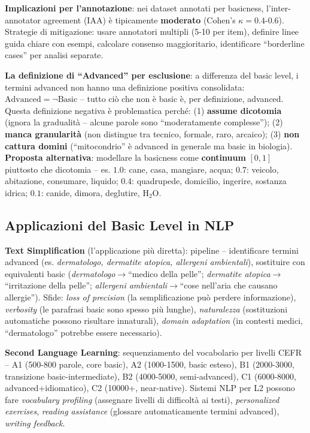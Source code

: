 \documentclass[12pt,a4paper]{article}
\begin{document}
\textbf{Implicazioni per l'annotazione}: nei dataset annotati per basicness, l'inter-annotator agreement (IAA) \`e tipicamente \textbf{moderato} (Cohen's $\kappa = 0.4$-$0.6$). Strategie di mitigazione: usare annotatori multipli (5-10 per item), definire linee guida chiare con esempi, calcolare consenso maggioritario, identificare ``borderline cases'' per analisi separate.

\textbf{La definizione di ``Advanced'' per esclusione}: a differenza del basic level, i termini advanced non hanno una definizione positiva consolidata: $\text{Advanced} = \neg \text{Basic}$ -- tutto ci\`o che non \`e basic \`e, per definizione, advanced. Questa definizione negativa \`e problematica perch\'e: (1) \textbf{assume dicotomia} (ignora la gradualit\`a -- alcune parole sono ``moderatamente complesse''); (2) \textbf{manca granularit\`a} (non distingue tra tecnico, formale, raro, arcaico); (3) \textbf{non cattura domini} (``mitocondrio'' \`e advanced in generale ma basic in biologia). \textbf{Proposta alternativa}: modellare la basicness come \textbf{continuum} $[0,1]$ piuttosto che dicotomia -- es. $1.0$: cane, casa, mangiare, acqua; $0.7$: veicolo, abitazione, consumare, liquido; $0.4$: quadrupede, domicilio, ingerire, sostanza idrica; $0.1$: canide, dimora, deglutire, H$_2$O.

\subsection{Applicazioni del Basic Level in NLP}

\textbf{Text Simplification} (l'applicazione pi\`u diretta): pipeline -- identificare termini advanced (es. \textit{dermatologo, dermatite atopica, allergeni ambientali}), sostituire con equivalenti basic (\textit{dermatologo}$\to$``medico della pelle''; \textit{dermatite atopica}$\to$``irritazione della pelle''; \textit{allergeni ambientali}$\to$``cose nell'aria che causano allergie''). Sfide: \emph{loss of precision} (la semplificazione pu\`o perdere informazione), \emph{verbosity} (le parafrasi basic sono spesso pi\`u lunghe), \emph{naturalezza} (sostituzioni automatiche possono risultare innaturali), \emph{domain adaptation} (in contesti medici, ``dermatologo'' potrebbe essere necessario).

\textbf{Second Language Learning}: sequenziamento del vocabolario per livelli CEFR -- A1 (500-800 parole, core basic), A2 (1000-1500, basic esteso), B1 (2000-3000, transizione basic-intermediate), B2 (4000-5000, semi-advanced), C1 (6000-8000, advanced+idiomatico), C2 (10000+, near-native). Sistemi NLP per L2 possono fare \emph{vocabulary profiling} (assegnare livelli di difficolt\`a ai testi), \emph{personalized exercises}, \emph{reading assistance} (glossare automaticamente termini advanced), \emph{writing feedback}.
\end{document}
